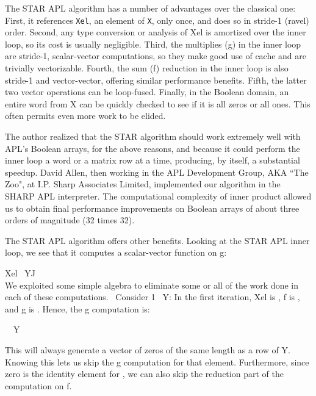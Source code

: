 

The STAR APL algorithm has a number of advantages over the classical
one: First, it references {\tt Xel}, an element of {\tt X}, only once, and
does so in stride-1 (ravel) order. Second, any type conversion or
analysis of {\apl Xel} is amortized over
the inner loop, so its cost is usually negligible. 
Third, the multiplies ({\apl g}) in the inner loop are stride-1, 
scalar-vector computations, so
they make good use of cache and are trivially vectorizable.
Fourth, the sum ({\apl f}) reduction in the inner loop is also stride-1
and vector-vector, offering similar performance benefits.
Fifth, the latter two vector operations can be loop-fused.
Finally, in the Boolean domain, an entire word from {\apl X} can
be quickly checked to see if it is all zeros or all ones.
This often permits even more work to be elided.

The author realized that the STAR algorithm should work extremely well
with APL's Boolean arrays, for the above reasons, and because
it could perform the inner loop a word or a matrix row at a time,
producing, by itself, a substantial speedup.
David Allen, then working in the APL Development Group, AKA ``The Zoo",
at I.P. Sharp Associates Limited, implemented our algorithm in 
the SHARP APL interpreter. The computational complexity 
of inner product allowed us to obtain
final performance improvements on Boolean arrays of
about three orders of magnitude (32 times 32). 

The STAR APL algorithm offers other benefits.
Looking at the STAR APL inner loop, we see that it computes a
scalar-vector function on {\apl g}:

\medskip
{\apl Xel \qtimes~Y\qlbr\0J\qsemic\qrbr}\\

\noindent We exploited some
simple algebra to eliminate some or all of the work done
in each of these computations.~\cite{RBernecky:apex}
Consider { 1 \qor\qdot\qand~Y}: In the first iteration,
{\apl Xel} is {}, {\apl f} is {\apl \qor}, and {\apl g} is {\apl \qand}.
Hence, the {\apl g} computation is:

{~\qand~Y\qsemic\qrbr}

\noindent This will always generate a vector of zeros of the same
length as a row of {\apl Y}. Knowing this lets us skip
the {\apl g} computation for that element.
Furthermore, since zero is the identity element for {\apl \qor},
we can also skip the reduction part of the computation on {\apl f}. 

